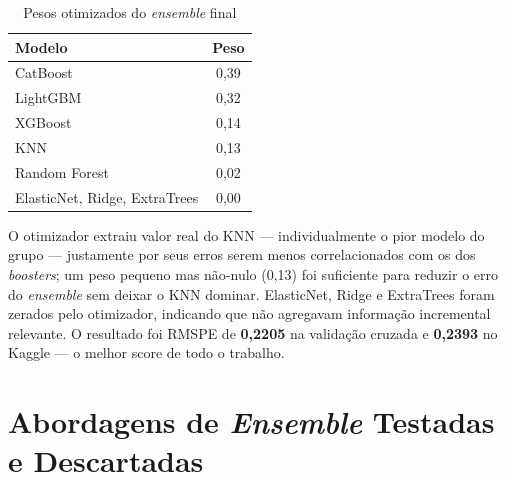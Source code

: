 \documentclass[12pt, a4paper]{article}
\begin{document}
\begin{table}[H]
  \centering
  \caption{Pesos otimizados do \textit{ensemble} final}
  \label{tab:pesos}
  \small{}
  \begin{tabular}{lc}
    \toprule
    \rowcolor{headerblue}
    \color{white}\textbf{Modelo} & \color{white}\textbf{Peso} \\
    \midrule
    CatBoost      & 0,39 \\
    LightGBM      & 0,32 \\
    XGBoost       & 0,14 \\
    KNN           & 0,13 \\
    Random Forest & 0,02 \\
    ElasticNet, Ridge, ExtraTrees & 0,00 \\
    \bottomrule
  \end{tabular}
\end{table}

O otimizador extraiu valor real do KNN --- individualmente o pior modelo do grupo --- justamente por seus erros serem menos correlacionados com os dos \textit{boosters}; um peso pequeno mas não-nulo (0,13) foi suficiente para reduzir o erro do \textit{ensemble} sem deixar o KNN dominar. ElasticNet, Ridge e ExtraTrees foram zerados pelo otimizador, indicando que não agregavam informação incremental relevante. O resultado foi RMSPE de \textbf{0,2205} na validação cruzada e \textbf{0,2393} no Kaggle --- o melhor score de todo o trabalho.

\section{Abordagens de \textit{Ensemble} Testadas e Descartadas}
\end{document}
